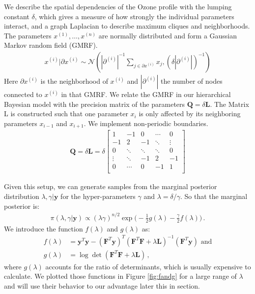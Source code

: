 We describe the spatial dependencies of the Ozone profile with the lumping constant $\delta$, which gives a measure of how strongly the individual parameters interact, and a graph Laplacian to describe maximum cliques and neighborhoods.
The parameters $x^{(1)}, \dots, x^{(n)}$ are normally distributed and form a Gaussian Markov random field (GMRF).
\begin{align}
    x^{(i)}| \partial x^{(i)} \sim  \mathcal{N}( |\partial^{(i)}|^{-1} \sum\nolimits_{j\in \partial x^{(i)} } x_j , (\delta |\partial^{(i)}|)^{-1}  )
\end{align}
Here $\partial x^{(i)}$ is the neighborhood of $x^{(i)}$ and $|\partial^{(i)}|$ the number of nodes connected to $x^{(i)}$ in that GMRF.
We relate the GMRF in our hierarchical Bayesian model with the precision matrix of the parameters $\bm{Q}= \delta \bm{L}$.
The Matrix L is constructed such that one parameter $x_i$ is only affected by its neighboring parameters $x_{i-1}$ and $x_{i+1}$.
We implement non-periodic boundaries.
\begin{align}
 \bm{Q}= \delta \bm{L} =
    \delta
\begin{bmatrix}
     1 & -1 & 0 & \cdots & 0\\
     -1 & 2 & -1 & \ddots & \vdots \\
     0 & \ddots & \ddots & \ddots & 0 \\ 
     \vdots & \ddots  & -1 & 2 & -1 \\
       0 & \cdots & 0 & -1 & 1 \\
\end{bmatrix}  
\end{align}

Given this setup, we can generate samples from the marginal posterior distribution $\lambda, \gamma | \bm{y}$ for the hyper-parameters $\gamma$ and $\lambda = \delta / \gamma$.
So that the marginal posterior is:
\begin{align}
    \pi(\lambda, \gamma | \bm{y})
    \propto ( \lambda \gamma)^{n/2} \exp{ \Bigg( - \frac{1}{2} g ( \lambda) - \frac{\gamma}{2} f ( \lambda) \Bigg) } \, .
    \label{eq:MargPostAppl}
\end{align}
We introduce the function $f(\lambda)$ and $g(\lambda)$ as:
\begin{subequations}
\label{eq:fandg}
\begin{align}
    f ( \lambda) &= \bm{y}^T \bm{y} - (\bm{F}^T \bm{y})^T (\bm{F}^T  \bm{F} + \lambda \bm{L})^{-1} (\bm{F}^T \bm{y})  \label{eq:f} \, \,  \text{and} \\
    g(\lambda) &= \log \det (\bm{F}^T  \bm{F} + \lambda \bm{L}) \label{eq:g}\,,
\end{align}
\end{subequations}
where $g(\lambda)$ accounts for the ratio of determinants, which is usually expensive to calculate.
We plotted those functions in Figure \ref{fig:fandg} for a large range of $\lambda$ and will use their behavior to our advantage later this in section.

